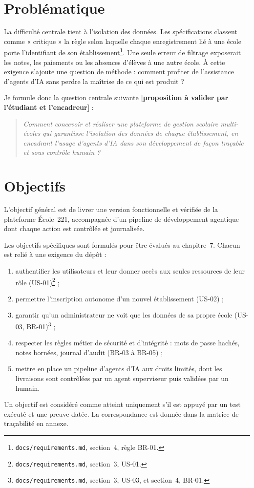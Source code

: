 \section*{Problématique}

La difficulté centrale tient à l'isolation des données. Les spécifications classent comme « critique » la règle selon laquelle chaque enregistrement lié à une école porte l'identifiant de son établissement\footnote{\nolinkurl{docs/requirements.md}, section~4, règle BR-01.}. Une seule erreur de filtrage exposerait les notes, les paiements ou les absences d'élèves à une autre école. À cette exigence s'ajoute une question de méthode : comment profiter de l'assistance d'agents d'IA sans perdre la maîtrise de ce qui est produit ?

Je formule donc la question centrale suivante \textbf{[proposition à valider par l'étudiant et l'encadreur]} :

\begin{quote}
\emph{Comment concevoir et réaliser une plateforme de gestion scolaire multi-écoles qui garantisse l'isolation des données de chaque établissement, en encadrant l'usage d'agents d'IA dans son développement de façon traçable et sous contrôle humain ?}
\end{quote}

\section*{Objectifs}

L'objectif général est de livrer une version fonctionnelle et vérifiée de la plateforme École~221, accompagnée d'un pipeline de développement agentique dont chaque action est contrôlée et journalisée.

Les objectifs spécifiques sont formulés pour être évalués au chapitre~7. Chacun est relié à une exigence du dépôt :
\begin{enumerate}
  \item authentifier les utilisateurs et leur donner accès aux seules ressources de leur rôle (US-01)\footnote{\nolinkurl{docs/requirements.md}, section~3, US-01.} ;
  \item permettre l'inscription autonome d'un nouvel établissement (US-02) ;
  \item garantir qu'un administrateur ne voit que les données de sa propre école (US-03, BR-01)\footnote{\nolinkurl{docs/requirements.md}, section~3, US-03, et section~4, BR-01.} ;
  \item respecter les règles métier de sécurité et d'intégrité : mots de passe hachés, notes bornées, journal d'audit (BR-03 à BR-05) ;
  \item mettre en place un pipeline d'agents d'IA aux droits limités, dont les livraisons sont contrôlées par un agent superviseur puis validées par un humain.
\end{enumerate}
Un objectif est considéré comme atteint uniquement s'il est appuyé par un test exécuté et une preuve datée. La correspondance est donnée dans la matrice de traçabilité en annexe.


